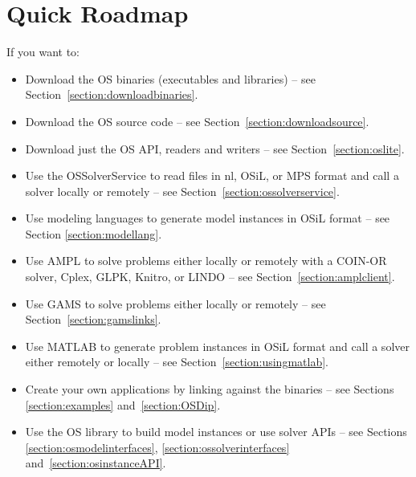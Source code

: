 \section{Quick Roadmap}\label{section:roadmap}

If you want to:

\begin{itemize}
\item Download the OS binaries  (executables and libraries) -- see Section~\ref{section:downloadbinaries}.

\ifruncode\else

\item Download the OS source code -- see Section~\ref{section:downloadsource}.

\item Download just the OS API, readers and writers -- see Section~\ref{section:oslite}.
\fi

\item Use the OSSolverService to read files in nl, OSiL, 
or MPS format and call a solver locally or remotely -- see Section~\ref{section:ossolverservice}.

\item Use modeling languages to generate model instances in OSiL format -- see Section \ref{section:modellang}.

\item Use AMPL to solve problems either locally or remotely
with a COIN-OR solver, Cplex,
GLPK, \ifknitro Knitro, \fi
or LINDO -- see Section~\ref{section:amplclient}.

\item Use GAMS to solve problems either locally or remotely -- see Section~\ref{section:gamslinks}.

\item Use MATLAB to generate problem instances in OSiL format and call a solver either remotely or locally
 -- see Section~\ref{section:usingmatlab}.

\ifruncode\else
\item Create your own applications by linking against the binaries -- see Sections \ref{section:examples} and~\ref{section:OSDip}.

\item Use the OS library to build model instances or use solver APIs -- see Sections \ref{section:osmodelinterfaces},
\ref{section:ossolverinterfaces} and~\ref{section:osinstanceAPI}.


\end{itemize}
